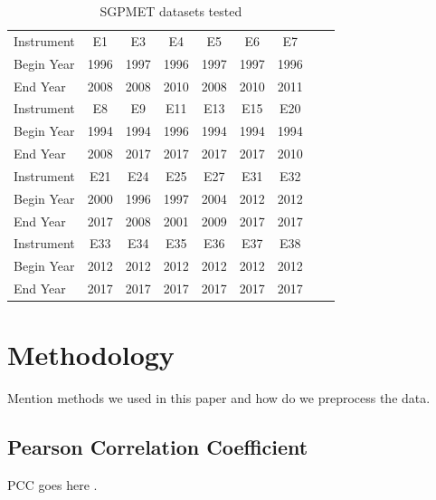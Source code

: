 \documentclass[letterpaper, 10 pt, conference]{ieeeconf}  %
\begin{document}
\begin{table}[ht]
\caption{SGPMET datasets tested}
\label{tab:template}
\centering
\begin{tabular}{|l|c|c|c|c|c|c|c|c|}
\hline
Instrument & E1 & E3 & E4 & E5 & E6 & E7\\
Begin Year & 1996 & 1997 & 1996 & 1997 & 1997 & 1996\\
End Year & 2008 & 2008 & 2010 & 2008 & 2010 & 2011\\
\hline
Instrument & E8 & E9 & E11 & E13 & E15 & E20\\
Begin Year & 1994 & 1994 & 1996 & 1994 & 1994 & 1994\\
End Year & 2008 & 2017 & 2017 & 2017 & 2017 & 2010\\
\hline
Instrument & E21 & E24 & E25 & E27 & E31 & E32\\
Begin Year & 2000 & 1996 & 1997 & 2004 & 2012 & 2012\\
End Year & 2017 & 2008 & 2001 & 2009 & 2017 & 2017\\
\hline
Instrument & E33 & E34 & E35 & E36 & E37 & E38\\
Begin Year & 2012 & 2012 & 2012 & 2012 & 2012 & 2012\\
End Year & 2017 & 2017 & 2017 & 2017 & 2017 & 2017\\
\hline
\end{tabular}
\end{table}


\section{Methodology}
Mention methods we used in this paper and how do we preprocess the data.

\subsection{Pearson Correlation Coefficient} 
PCC goes here \cite{pearson1895note}.

\end{document}
